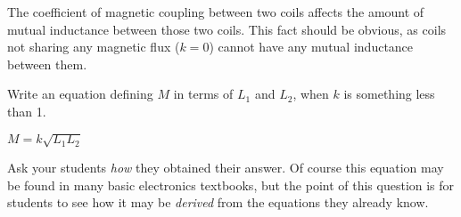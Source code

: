 

The coefficient of magnetic coupling between two coils affects the amount of mutual inductance between those two coils.  This fact should be obvious, as coils not sharing any magnetic flux ($k = 0$) cannot have any mutual inductance between them.

Write an equation defining $M$ in terms of $L_1$ and $L_2$, when $k$ is something less than 1.







$M = k \sqrt{L_1 L_2}$







Ask your students {\it how} they obtained their answer.  Of course this equation may be found in many basic electronics textbooks, but the point of this question is for students to see how it may be {\it derived} from the equations they already know.





